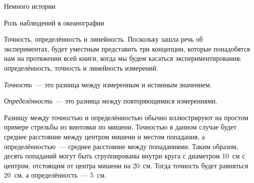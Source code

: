 \begin{chapter}{Немного истории}
\begin{section}{Роль наблюдений в океанографии}
\begin{paragraph}{Точность, определённость и линейность.}
Поскольку зашла речь об экспериментах, будет уместным представить 
три концепции, которые понадобятся нам на протяжении всей книги, 
когда мы будем касаться экспериментирования: определённость, точность 
и линейность измерений.
%

\emph{Точность}~--- это разница между измеренным и истинным значением.
%

\emph{Определённость}~--- это разница между повторяющимися измерениями.

Разницу между точностью и определённостью обычно иллюстрируют на
простом примере стрельбы из винтовки по мишени. Точностью в данном случае 
будет среднее расстояние между центром мишени и местом попадания, 
а определённостью~--- среднее расстояние между попаданиями. 
Таким образом, десять попаданий
могут быть сгруппированы внутри круга с диаметром 10~см с центром,
отстоящим от центра мишени на 20~см. Тогда точность будет равняться 20~см, 
а определённость~--- 5~см.
%



\end{paragraph}
\end{section}
\end{chapter}
